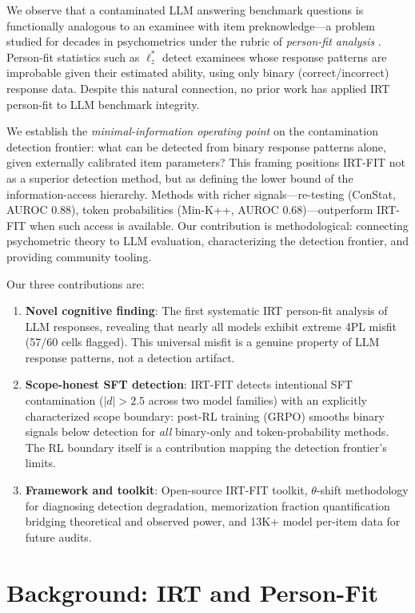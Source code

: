 \documentclass[11pt,a4paper]{article}
\begin{document}
We observe that a contaminated LLM answering benchmark questions is functionally analogous to an examinee with item preknowledge---a problem studied for decades in psychometrics under the rubric of \emph{person-fit analysis} \cite{meijer2001person}. Person-fit statistics such as $\ell_z^*$ detect examinees whose response patterns are improbable given their estimated ability, using only binary (correct/incorrect) response data. Despite this natural connection, no prior work has applied IRT person-fit to LLM benchmark integrity.

We establish the \emph{minimal-information operating point} on the contamination detection frontier: what can be detected from binary response patterns alone, given externally calibrated item parameters? This framing positions IRT-FIT not as a superior detection method, but as defining the lower bound of the information-access hierarchy. Methods with richer signals---re-testing (ConStat, AUROC 0.88), token probabilities (Min-K++, AUROC 0.68)---outperform IRT-FIT when such access is available. Our contribution is methodological: connecting psychometric theory to LLM evaluation, characterizing the detection frontier, and providing community tooling.

Our three contributions are:
\begin{enumerate}
    \item \textbf{Novel cognitive finding}: The first systematic IRT person-fit analysis of LLM responses, revealing that nearly all models exhibit extreme 4PL misfit (57/60 cells flagged). This universal misfit is a genuine property of LLM response patterns, not a detection artifact.
    \item \textbf{Scope-honest SFT detection}: IRT-FIT detects intentional SFT contamination ($|d| > 2.5$ across two model families) with an explicitly characterized scope boundary: post-RL training (GRPO) smooths binary signals below detection for \emph{all} binary-only and token-probability methods. The RL boundary itself is a contribution mapping the detection frontier's limits.
    \item \textbf{Framework and toolkit}: Open-source IRT-FIT toolkit, $\theta$-shift methodology for diagnosing detection degradation, memorization fraction quantification bridging theoretical and observed power, and 13K+ model per-item data for future audits.
\end{enumerate}

\section{Background: IRT and Person-Fit}
\end{document}
